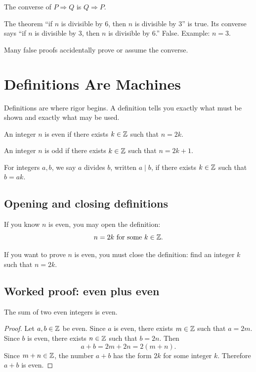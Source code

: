 \documentclass[11pt]{article}
\begin{document}
The converse of $P\Rightarrow Q$ is $Q\Rightarrow P$.

The theorem ``if $n$ is divisible by $6$, then $n$ is divisible by $3$'' is true. Its converse says ``if $n$ is divisible by $3$, then $n$ is divisible by $6$.'' False. Example: $n=3$.

Many false proofs accidentally prove or assume the converse.

\newpage
\section{Definitions Are Machines}

Definitions are where rigor begins. A definition tells you exactly what must be shown and exactly what may be used.

\begin{definition}
An integer $n$ is even if there exists $k\in\mathbb{Z}$ such that $n=2k$.
\end{definition}

\begin{definition}
An integer $n$ is odd if there exists $k\in\mathbb{Z}$ such that $n=2k+1$.
\end{definition}

\begin{definition}
For integers $a,b$, we say $a$ divides $b$, written $a\mid b$, if there exists $k\in\mathbb{Z}$ such that $b=ak$.
\end{definition}

\subsection{Opening and closing definitions}

If you know $n$ is even, you may open the definition:
\[
n=2k \text{ for some } k\in\mathbb{Z}.
\]

If you want to prove $n$ is even, you must close the definition: find an integer $k$ such that $n=2k$.

\subsection{Worked proof: even plus even}

\begin{theorem}
The sum of two even integers is even.
\end{theorem}

\begin{proof}
Let $a,b\in\mathbb{Z}$ be even. Since $a$ is even, there exists $m\in\mathbb{Z}$ such that $a=2m$. Since $b$ is even, there exists $n\in\mathbb{Z}$ such that $b=2n$. Then
\[
a+b=2m+2n=2(m+n).
\]
Since $m+n\in\mathbb{Z}$, the number $a+b$ has the form $2k$ for some integer $k$. Therefore $a+b$ is even.
\end{proof}
\end{document}
